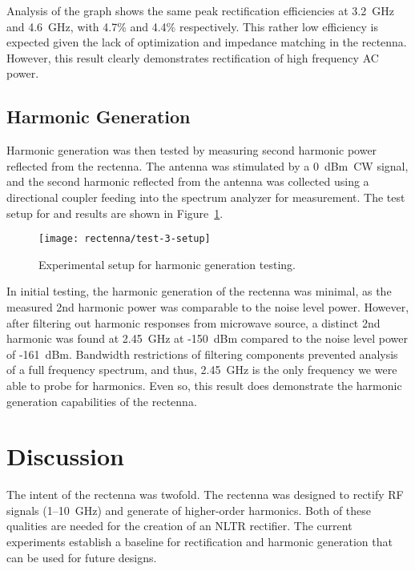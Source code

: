 Analysis of the graph shows the same peak rectification efficiencies at 3.2~GHz and 4.6~GHz, with 4.7\% and 4.4\% respectively. This rather low efficiency is expected given the lack of optimization and impedance matching in the rectenna. However, this result clearly demonstrates rectification of high frequency AC power.

\subsection{Harmonic Generation}

Harmonic generation was then tested by measuring second harmonic power reflected from the rectenna. The antenna was stimulated by a 0~dBm~CW signal, and the second harmonic reflected from the antenna was collected using a directional coupler feeding into the spectrum analyzer for measurement. The test setup for and results are shown in Figure~\ref{fig:rectenna-test-3-setup}.

\begin{figure}[h!]
\centering
\texttt{[image: rectenna/test-3-setup]}
\caption{Experimental setup for harmonic generation testing.}
\label{fig:rectenna-test-3-setup}
\end{figure}

In initial testing, the harmonic generation of the rectenna was minimal, as the measured 2nd harmonic power was comparable to the noise level power. However, after filtering out harmonic responses from microwave source, a distinct 2nd harmonic was found at 2.45~GHz at -150~dBm compared to the noise level power of -161~dBm. Bandwidth restrictions of filtering components prevented analysis of a full frequency spectrum, and thus, 2.45~GHz is the only frequency we were able to probe for harmonics. Even so, this result does demonstrate the harmonic generation capabilities of the rectenna.

\section{Discussion}
\label{sec:rectenna-discussion}

The intent of the rectenna was twofold. The rectenna was designed to rectify RF signals (\numrange{1}{10}~GHz) and generate of higher-order harmonics. Both of these qualities are needed for the creation of an NLTR rectifier. The current experiments establish a baseline for rectification and harmonic generation that can be used for future designs.

